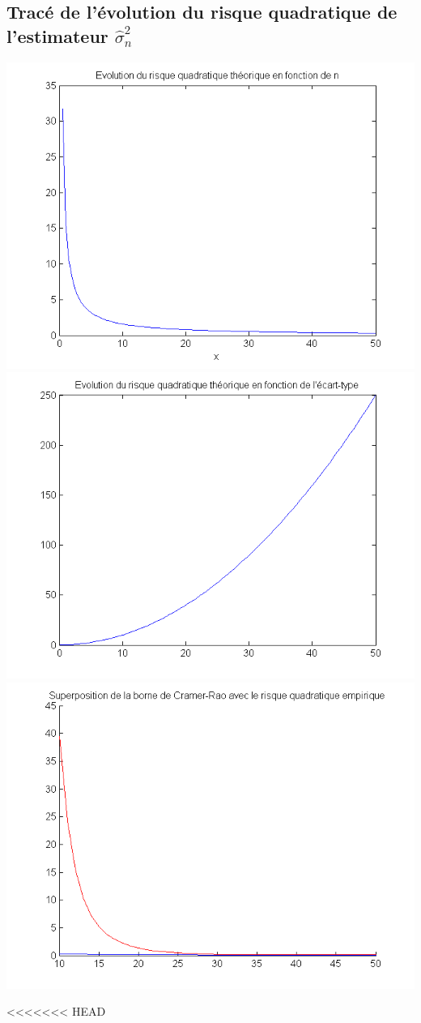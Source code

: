\documentclass{report}
\begin{document}
		\subsection{Tracé de l'évolution du risque quadratique de l'estimateur $\hat\sigma^2_n$}
			\begin{center}
				\includegraphics[scale=0.7]{sources/Q314-1.png}
				\includegraphics[scale=0.7]{sources/Q314-2.png}
				\includegraphics[scale=0.7]{sources/Q314-3.png}
			\end{center}
<<<<<<< HEAD
\end{document}
